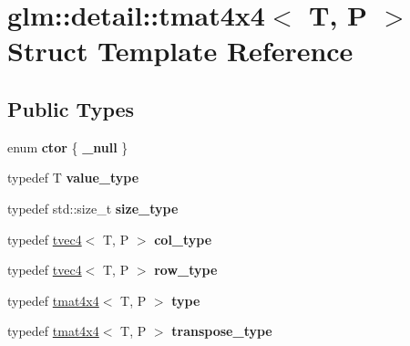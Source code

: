 \hypertarget{structglm_1_1detail_1_1tmat4x4}{}\section{glm\+:\+:detail\+:\+:tmat4x4$<$ T, P $>$ Struct Template Reference}
\label{structglm_1_1detail_1_1tmat4x4}
\subsection*{Public Types}
\begin{DoxyCompactItemize}
\item 
enum {\bfseries ctor} \{ {\bfseries \+\_\+null}
 \}\hypertarget{structglm_1_1detail_1_1tmat4x4_a314ae2df1758ddf97e2b024c32649cef}{}\label{structglm_1_1detail_1_1tmat4x4_a314ae2df1758ddf97e2b024c32649cef}

\item 
typedef T {\bfseries value\+\_\+type}\hypertarget{structglm_1_1detail_1_1tmat4x4_adce6da39b62e447be40eaa843bc774e3}{}\label{structglm_1_1detail_1_1tmat4x4_adce6da39b62e447be40eaa843bc774e3}

\item 
typedef std\+::size\+\_\+t {\bfseries size\+\_\+type}\hypertarget{structglm_1_1detail_1_1tmat4x4_a902f3edef1874ef653562bdd9947fcf9}{}\label{structglm_1_1detail_1_1tmat4x4_a902f3edef1874ef653562bdd9947fcf9}

\item 
typedef \hyperlink{structglm_1_1detail_1_1tvec4}{tvec4}$<$ T, P $>$ {\bfseries col\+\_\+type}\hypertarget{structglm_1_1detail_1_1tmat4x4_ade9e794ddd9c2758005f29ddb84e320f}{}\label{structglm_1_1detail_1_1tmat4x4_ade9e794ddd9c2758005f29ddb84e320f}

\item 
typedef \hyperlink{structglm_1_1detail_1_1tvec4}{tvec4}$<$ T, P $>$ {\bfseries row\+\_\+type}\hypertarget{structglm_1_1detail_1_1tmat4x4_a5db91d0e5acad7201a6624c595bcb462}{}\label{structglm_1_1detail_1_1tmat4x4_a5db91d0e5acad7201a6624c595bcb462}

\item 
typedef \hyperlink{structglm_1_1detail_1_1tmat4x4}{tmat4x4}$<$ T, P $>$ {\bfseries type}\hypertarget{structglm_1_1detail_1_1tmat4x4_a692f6b423a90288bd4043a6c447f7864}{}\label{structglm_1_1detail_1_1tmat4x4_a692f6b423a90288bd4043a6c447f7864}

\item 
typedef \hyperlink{structglm_1_1detail_1_1tmat4x4}{tmat4x4}$<$ T, P $>$ {\bfseries transpose\+\_\+type}\hypertarget{structglm_1_1detail_1_1tmat4x4_a92072726f44cd765df13235e7a1c45a8}{}\label{structglm_1_1detail_1_1tmat4x4_a92072726f44cd765df13235e7a1c45a8}

\end{DoxyCompactItemize}
